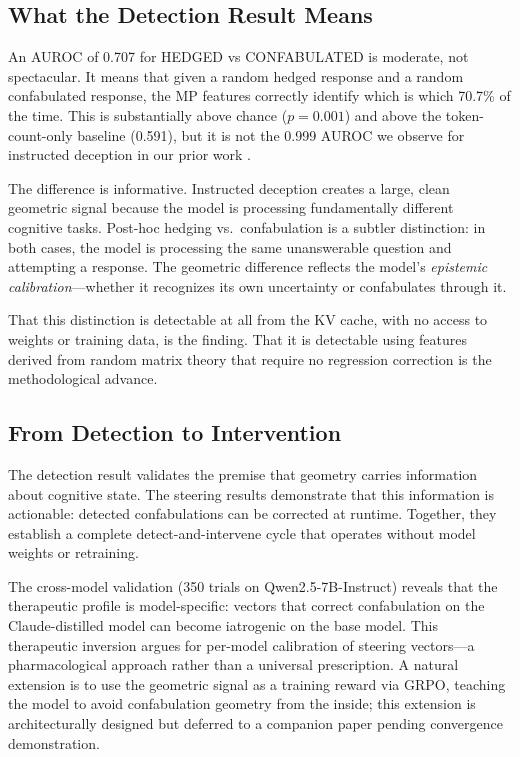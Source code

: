 \subsection{What the Detection Result Means}

An AUROC of 0.707 for HEDGED vs CONFABULATED is moderate, not spectacular.
It means that given a random hedged response and a random confabulated
response, the MP features correctly identify which is which 70.7\% of the
time. This is substantially above chance ($p = 0.001$) and above the
token-count-only baseline (0.591), but it is not the 0.999 AUROC we
observe for instructed deception in our prior work \citep{lyra2026detecting}.

The difference is informative. Instructed deception creates a large,
clean geometric signal because the model is processing fundamentally
different cognitive tasks. Post-hoc hedging vs.\ confabulation is a
subtler distinction: in both cases, the model is processing the same
unanswerable question and attempting a response. The geometric difference
reflects the model's \emph{epistemic calibration}---whether it recognizes
its own uncertainty or confabulates through it.

That this distinction is detectable at all from the KV cache, with no
access to weights or training data, is the finding. That it is detectable
using features derived from random matrix theory that require no
regression correction is the methodological advance.

\subsection{From Detection to Intervention}

The detection result validates the premise that geometry carries
information about cognitive state. The steering results demonstrate
that this information is actionable: detected confabulations can be
corrected at runtime. Together, they establish a complete
detect-and-intervene cycle that operates without model weights or
retraining.

The cross-model validation (350 trials on Qwen2.5-7B-Instruct)
reveals that the therapeutic profile is model-specific: vectors that
correct confabulation on the Claude-distilled model can become
iatrogenic on the base model. This therapeutic inversion argues for
per-model calibration of steering vectors---a pharmacological approach
rather than a universal prescription. A natural extension is to use
the geometric signal as a training reward via GRPO, teaching the model
to avoid confabulation geometry from the inside; this extension is
architecturally designed but deferred to a companion paper pending
convergence demonstration.

